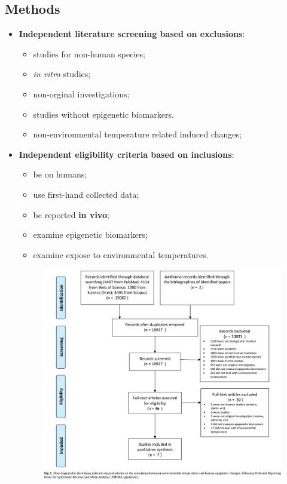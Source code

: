 \documentclass[plain, basic]{inVerba-notes}
\begin{document}
\begin{itemize}
  \subsection{Methods}
  \begin{itemize}
  \item \textbf{Independent literature screening based on exclusions}:
  \begin{multicols}{2}
    \begin{itemize}
      \item studies for non-human species;
      \item \textit{in vitro} studies;
      \item non-orginal investigations;
      \item studies without epigenetic biomarkers.
      \item non-environmental temperature related induced changes;
    \end{itemize}
  \end{multicols}
  \item \textbf{Independent eligibility criteria based on inclusions}:
  \begin{multicols}{2}
    \begin{itemize}
      \item be on humans;
      \item use first-hand collected data;
      \item be reported \textbf{in vivo};
      \item examine epigenetic biomarkers;
      \item examine expose to environmental temperatures. 
    \end{itemize}
  \end{multicols}
  \begin{figure}[h]
    \centering
    \includegraphics[scale=0.33]{images/fig-4-1.png} %
  \end{figure}
\end{itemize}


\end{itemize}
\end{document}
